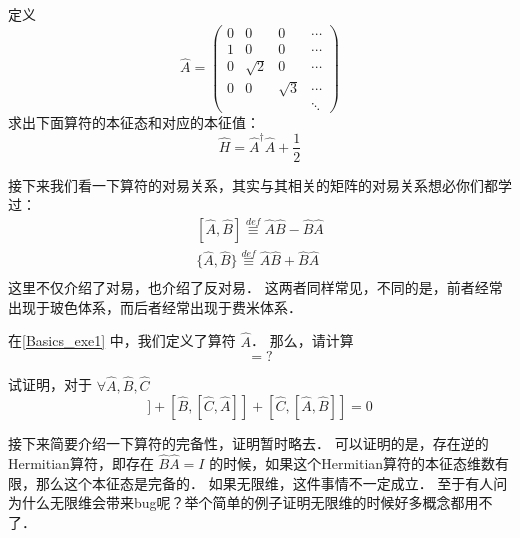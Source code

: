 \begin{exer}{}\label{Basics_exe1}
定义
\begin{equation}
\hat{A} = \left(
\begin{matrix}
0 & 0 & 0 & \cdots \\
1 & 0 & 0 & \cdots \\
0 & \sqrt{2} & 0 & \cdots\\
0 & 0 & \sqrt{3} & \cdots\\
  &  &  &  \ddots
\end{matrix}
\right)
\end{equation}
求出下面算符的本征态和对应的本征值：
\begin{equation}
\hat{H} = \hat{A}^{\dagger}\hat{A} + \frac{1}{2}
\end{equation}
\end{exer}

接下来我们看一下算符的对易关系，其实与其相关的矩阵的对易关系想必你们都学过：
\begin{equation}
\begin{split}
[\hat{A},\hat{B}] \overset{def}{\equiv}\hat{A}\hat{B} - \hat{B}\hat{A}\\
\{\hat{A},\hat{B}\} \overset{def}{\equiv}\hat{A}\hat{B} + \hat{B}\hat{A}\\
\end{split}
\end{equation}
这里不仅介绍了对易，也介绍了反对易． 这两者同样常见，不同的是，前者经常出现于玻色体系，而后者经常出现于费米体系．

\begin{exer}{}
在\autoref{Basics_exe1} 中，我们定义了算符 $\hat{A}$． 那么，请计算
\begin{equation}
[\hat{A},\hat{A}^{\dagger}] = ?
\end{equation}
\end{exer}{}

\begin{exer}{}
试证明，对于 $\forall \hat{A}, \hat{B}, \hat{C}$
\begin{equation}
[\hat{A},[\hat{B},\hat{C}]] + [\hat{B},[\hat{C},\hat{A}]] + [\hat{C},[\hat{A},\hat{B}]] = 0
\end{equation}
\end{exer}{}

接下来简要介绍一下算符的完备性，证明暂时略去． 可以证明的是，存在逆的Hermitian算符，即存在 $\hat{B}\hat{A} = I$ 的时候，如果这个Hermitian算符的本征态维数有限，那么这个本征态是完备的． 如果无限维，这件事情不一定成立． 至于有人问为什么无限维会带来bug呢？举个简单的例子证明无限维的时候好多概念都用不了．

